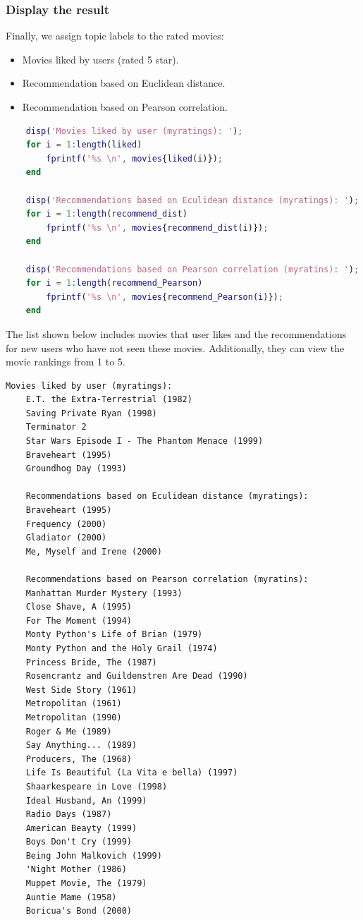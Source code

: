 \subsubsection{Display the result}

Finally, we assign topic labels to the rated movies:

\begin{itemize}[label=-]
	\item Movies liked by users (rated 5 star).
	\item Recommendation based on Euclidean distance.
	\item Recommendation based on Pearson correlation.
\end{itemize}

\begin{lstlisting}[style=StyleCode, language=MATLAB]
	% Display recommendations and Liked Moives
	disp('Movies liked by user (myratings): ');
	for i = 1:length(liked)
		fprintf('%s \n', movies{liked(i)});
	end
	
	disp('Recommendations based on Eculidean distance (myratings): ');
	for i = 1:length(recommend_dist)
		fprintf('%s \n', movies{recommend_dist(i)});
	end
	
	disp('Recommendations based on Pearson correlation (myratins): ');
	for i = 1:length(recommend_Pearson)
		fprintf('%s \n', movies{recommend_Pearson(i)});
	end
\end{lstlisting}

The list shown below includes movies that user likes and the recommendations for new users who have not seen these movies. Additionally, they can view the movie rankings from 1 to 5.

\begin{lstlisting}[style=StyleResult]
	Movies liked by user (myratings): 
	E.T. the Extra-Terrestrial (1982)
	Saving Private Ryan (1998)
	Terminator 2
	Star Wars Episode I - The Phantom Menace (1999)
	Braveheart (1995)
	Groundhog Day (1993)
	
	Recommendations based on Eculidean distance (myratings): 
	Braveheart (1995)
	Frequency (2000)
	Gladiator (2000)
	Me, Myself and Irene (2000)
	
	Recommendations based on Pearson correlation (myratins): 
	Manhattan Murder Mystery (1993)
	Close Shave, A (1995)
	For The Moment (1994)
	Monty Python's Life of Brian (1979)
	Monty Python and the Holy Grail (1974)
	Princess Bride, The (1987)
	Rosencrantz and Guildenstren Are Dead (1990)
	West Side Story (1961)
	Metropolitan (1961)
	Metropolitan (1990)
	Roger & Me (1989)
	Say Anything... (1989)
	Producers, The (1968)
	Life Is Beautiful (La Vita e bella) (1997)
	Shaarkespeare in Love (1998)
	Ideal Husband, An (1999)
	Radio Days (1987)
	American Beayty (1999)
	Boys Don't Cry (1999)
	Being John Malkovich (1999)
	'Night Mother (1986)
	Muppet Movie, The (1979)
	Auntie Mame (1958)
	Boricua's Bond (2000)
\end{lstlisting}